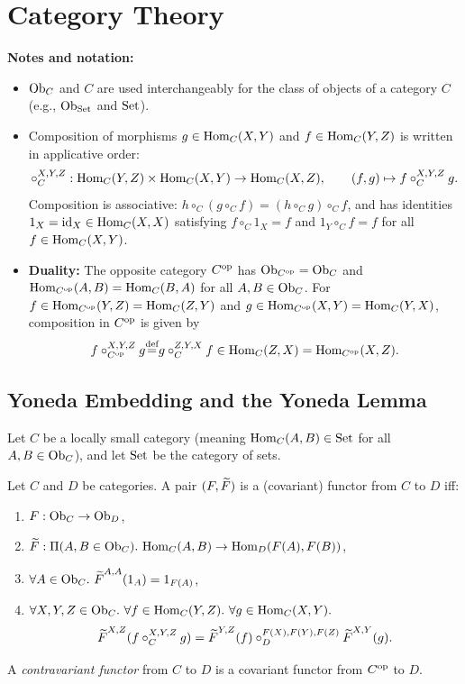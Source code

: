 \documentclass[10pt,a4paper]{article}
\begin{document}
\section{Category Theory}
\noindent\textbf{Notes and notation:}
\begin{itemize}
\item ${\textrm{Ob}}_C$ and $C$ are used interchangeably for the class of objects of a category $C$ (e.g., ${\textrm{Ob}}_{\textrm{Set}}$ and ${\textrm{Set}}$).
\item Composition of morphisms $g \in {\textrm{Hom}}_C(X,Y)$ and $f \in {\textrm{Hom}}_C(Y,Z)$ is written in applicative order:
$$\circ_C^{X,Y,Z} : {\textrm{Hom}}_C(Y,Z) \times {\textrm{Hom}}_C(X,Y) \to {\textrm{Hom}}_C(X,Z), \qquad (f, g) \mapsto f \circ_C^{X,Y,Z} g.$$
Composition is associative: $h \circ_C (g \circ_C f) = (h \circ_C g) \circ_C f$, and has identities $1_X = {\textrm{id}}_X \in {\textrm{Hom}}_C(X,X)$ satisfying $f \circ_C 1_X = f$ and $1_Y \circ_C f = f$ for all $f \in {\textrm{Hom}}_C(X,Y)$.
\item \textbf{Duality:} The opposite category $C^{\textrm{op}}$ has ${\textrm{Ob}}_{C^{\textrm{op}}} = {\textrm{Ob}}_C$ and ${\textrm{Hom}}_{C^{\textrm{op}}}(A,B) = {\textrm{Hom}}_C(B,A)$ for all $A,B \in {\textrm{Ob}}_C$. For $f \in {\textrm{Hom}}_{C^{\textrm{op}}}(Y,Z) = {\textrm{Hom}}_C(Z,Y)$ and $g \in {\textrm{Hom}}_{C^{\textrm{op}}}(X,Y) = {\textrm{Hom}}_C(Y,X)$, composition in $C^{\textrm{op}}$ is given by
$$f \circ_{C^{\textrm{op}}}^{X,Y,Z} g {\stackrel{{\textrm{def}}}{=}} g \circ_C^{Z,Y,X} f \in {\textrm{Hom}}_C(Z,X) = {\textrm{Hom}}_{C^{\textrm{op}}}(X,Z).$$
\end{itemize}

\subsection{Yoneda Embedding and the Yoneda Lemma}
Let $C$ be a locally small category (meaning ${\textrm{Hom}}_C(A,B) \in {\textrm{Set}}$ for all $A,B \in {\textrm{Ob}}_C$), and let ${\textrm{Set}}$ be the category of sets.

\begin{definition}
Let $C$ and $D$ be categories. A pair $(F, {\widetilde{F}\textrm{}})$ is a (covariant) functor from $C$ to $D$ iff:
\begin{enumerate}
\item $F : {\textrm{Ob}}_C \to {\textrm{Ob}}_D$,
\item $\FMor : \Pi(A, B \in \Ob_C).\ \Hom_C(A,B) \to \Hom_D(F(A), F(B))$,
\item $\forall A\in \Ob_C.\ \FMor^{A,A}(1_A)=1_{F(A)}$,
\item $\forall X,Y,Z \in {\textrm{Ob}}_C.\ \forall f\in{\textrm{Hom}}_C(Y,Z).\ \forall g\in{\textrm{Hom}}_C(X,Y).$
$${\widetilde{F}\textrm{}}^{X,Z}(f\circ_C^{X,Y,Z} g)={\widetilde{F}\textrm{}}^{Y,Z}(f)\circ_D^{F(X),F(Y),F(Z)} {\widetilde{F}\textrm{}}^{X,Y}(g).$$
\end{enumerate}
A \emph{contravariant functor} from $C$ to $D$ is a covariant functor from $C^{\textrm{op}}$ to $D$.
\end{definition}
\end{document}
